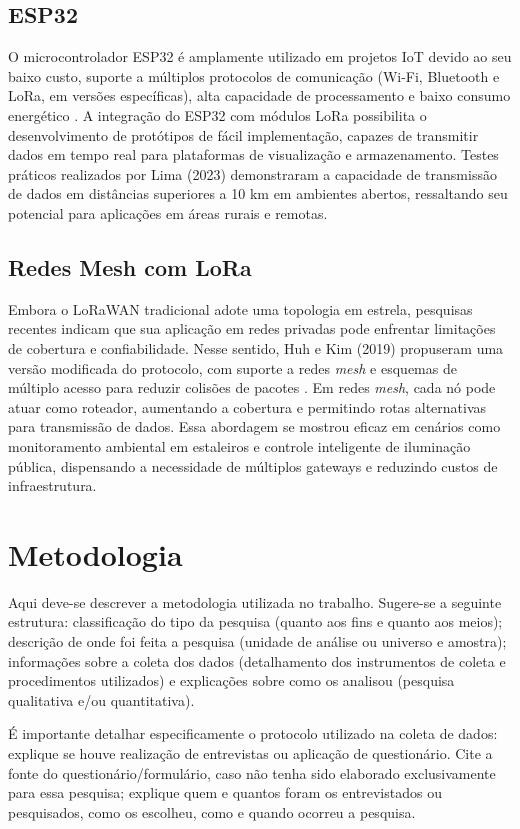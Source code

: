 \documentclass[
article,			%
11pt,				%
twoside,			%
a4paper,			%
section=TITLE,		%
onecolumn,          %
english,			%
brazil,				%
sumario=tradicional
]{abntex2}
\begin{document}
    \subsection{ESP32}
    O microcontrolador ESP32 é amplamente utilizado em projetos IoT devido ao seu baixo custo, suporte a múltiplos protocolos de comunicação (Wi-Fi, Bluetooth e LoRa, em versões específicas), alta capacidade de processamento e baixo consumo energético \cite{lima2023}. A integração do ESP32 com módulos LoRa possibilita o desenvolvimento de protótipos de fácil implementação, capazes de transmitir dados em tempo real para plataformas de visualização e armazenamento. Testes práticos realizados por Lima (2023) demonstraram a capacidade de transmissão de dados em distâncias superiores a 10 km em ambientes abertos, ressaltando seu potencial para aplicações em áreas rurais e remotas.

    \subsection{Redes Mesh com LoRa}
    Embora o LoRaWAN tradicional adote uma topologia em estrela, pesquisas recentes indicam que sua aplicação em redes privadas pode enfrentar limitações de cobertura e confiabilidade. Nesse sentido, Huh e Kim (2019) propuseram uma versão modificada do protocolo, com suporte a redes \textit{mesh} e esquemas de múltiplo acesso para reduzir colisões de pacotes \cite{huh2019}. Em redes \textit{mesh}, cada nó pode atuar como roteador, aumentando a cobertura e permitindo rotas alternativas para transmissão de dados. Essa abordagem se mostrou eficaz em cenários como monitoramento ambiental em estaleiros e controle inteligente de iluminação pública, dispensando a necessidade de múltiplos gateways e reduzindo custos de infraestrutura.

\section{Metodologia}
        
    Aqui deve-se descrever a metodologia utilizada no trabalho. Sugere-se a seguinte estrutura: classificação do tipo da pesquisa (quanto aos fins e quanto aos meios); descrição de onde foi feita a pesquisa (unidade de análise ou universo e amostra); informações sobre a coleta dos dados (detalhamento dos instrumentos de coleta e procedimentos utilizados) e explicações sobre como os analisou (pesquisa qualitativa e/ou quantitativa).

    É importante detalhar especificamente o protocolo utilizado na coleta de dados: explique se houve realização de entrevistas ou aplicação de questionário. Cite a fonte do questionário/formulário, caso não tenha sido elaborado exclusivamente para essa pesquisa; explique quem e quantos foram os entrevistados ou pesquisados, como os escolheu, como e quando ocorreu a pesquisa. 
\end{document}
